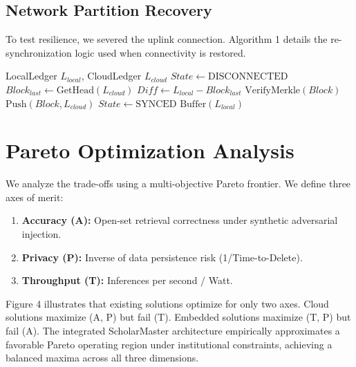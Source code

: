 \documentclass[conference]{IEEEtran}
\begin{document}
\subsection{Network Partition Recovery}
To test resilience, we severed the uplink connection. Algorithm 1 details the re-synchronization logic used when connectivity is restored.

\begin{algorithm}
\caption{Consensus Re-Synchronization}
\begin{algorithmic}[1]
\REQUIRE LocalLedger $L_{local}$, CloudLedger $L_{cloud}$
\STATE $State \gets \text{DISCONNECTED}$
        \STATE $Block_{last} \gets \text{GetHead}(L_{cloud})$
        \STATE $Diff \gets L_{local} - Block_{last}$
            \STATE $\text{VerifyMerkle}(Block)$
            \STATE $\text{Push}(Block, L_{cloud})$
        \ENDFOR
        \STATE $State \gets \text{SYNCED}$
    \ELSE
        \STATE $\text{Buffer}(L_{local})$ 
    \ENDIF
\ENDWHILE
\end{algorithmic}
\label{alg:sync}
\end{algorithm}

\section{Pareto Optimization Analysis}

We analyze the trade-offs using a multi-objective Pareto frontier. We define three axes of merit:
\begin{enumerate}
    \item \textbf{Accuracy (A):} Open-set retrieval correctness under synthetic adversarial injection.
    \item \textbf{Privacy (P):} Inverse of data persistence risk (1/Time-to-Delete).
    \item \textbf{Throughput (T):} Inferences per second / Watt.
\end{enumerate}

Figure 4 illustrates that existing solutions optimize for only two axes. Cloud solutions maximize (A, P) but fail (T). Embedded solutions maximize (T, P) but fail (A). The integrated ScholarMaster architecture empirically approximates a favorable Pareto operating region under institutional constraints, achieving a balanced maxima across all three dimensions.
\end{document}
